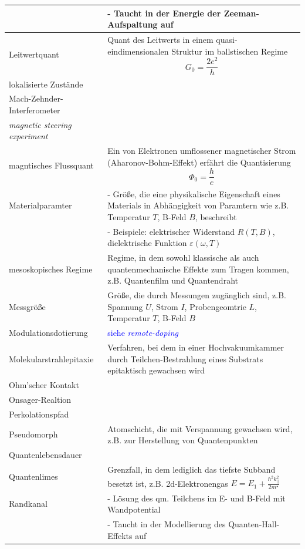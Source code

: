 \documentclass{article}
\begin{document}
\begin{xltabular}{\linewidth}{p{6cm}|X}
		& - Taucht in der Energie der Zeeman-Aufspaltung auf \\
	\hline
		Leitwertquant & Quant des Leitwerts in einem quasi-eindimensionalen Struktur im ballstischen Regime
			$$G_0 = \frac{2e^2}{h}$$ \\
	\hline
		lokalisierte Zustände &  \\
	\hline
		Mach-Zehnder-Interferometer &  \\
	\hline
		\textit{magnetic steering experiment} &  \\
	\hline
		magntisches Flussquant & Ein von Elektronen umflossener magnetischer Strom (Aharonov-Bohm-Effekt) erfährt die Quantisierung
			$$\Phi_0 = \frac{h}{e}$$ \\
	\hline
		Materialparamter & - Größe, die eine physikalische Eigenschaft eines Materials in Abhängigkeit von Paramtern wie z.B. Temperatur $T$, B-Feld $B$, beschreibt \\
		& - Beispiele: elektrischer Widerstand $R(T,B)$, dielektrische Funktion $\varepsilon(\omega, T)$ \\
	\hline
		mesoskopisches Regime & Regime, in dem sowohl klassische als auch quantenmechanische Effekte zum Tragen kommen, z.B. Quantenfilm und Quantendraht \\
	\hline
		Messgröße & Größe, die durch Messungen zugänglich sind, z.B. Spannung $U$, Strom $I$, Probengeomtrie $L$, Temperatur $T$, B-Feld $B$ \\
	\hline
		Modulationsdotierung & \textcolor{blue}{siehe \textit{remote-doping}} \\
	\hline
		Molekularstrahlepitaxie & Verfahren, bei dem in einer Hochvakuumkammer durch Teilchen-Bestrahlung eines Substrats epitaktisch gewachsen wird \\
	\hline
		Ohm'scher Kontakt &  \\
	\hline
		Onsager-Realtion &  \\
	\hline
		Perkolationspfad &  \\
	\hline
		Pseudomorph & Atomschicht, die mit Verspannung gewachsen wird, z.B. zur Herstellung von Quantenpunkten \\
	\hline
		Quantenlebensdauer &  \\
	\hline
		Quantenlimes & Grenzfall, in dem lediglich das tiefste Subband besetzt ist, z.B. 2d-Elektronengas $E=E_1+\frac{\hbar^2k_{||}^2}{2m^\star}$ \\
	\hline
		Randkanal & - Lösung des qm. Teilchens im E- und B-Feld mit Wandpotential \\
		& - Taucht in der Modellierung des Quanten-Hall-Effekts auf \\

\end{xltabular}
\end{document}
